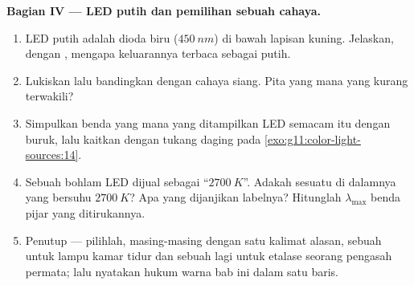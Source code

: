 \begin{problem}
\medskip
\noindent\textbf{Bagian IV --- LED putih dan pemilihan sebuah cahaya.}
\begin{enumerate}[resume]
  \item LED putih adalah dioda biru ($\qty{450}{nm}$) di bawah lapisan
         kuning. Jelaskan, dengan , mengapa
        keluarannya terbaca sebagai putih.
  \item Lukiskan  lalu bandingkan dengan 
        cahaya siang. Pita yang mana yang kurang terwakili?
  \item Simpulkan benda yang mana yang ditampilkan LED semacam itu
        dengan buruk, lalu kaitkan dengan tukang daging pada
        \cref{exo:g11:color-light-sources:14}.
  \item Sebuah bohlam LED dijual sebagai ``$\qty{2700}{K}$''. Adakah
        sesuatu di dalamnya yang bersuhu $\qty{2700}{K}$? Apa yang
        dijanjikan labelnya? Hitunglah $\lambda_{\max}$ benda pijar
        yang ditirukannya.
  \item Penutup --- pilihlah, masing-masing dengan satu kalimat
        alasan, sebuah  untuk lampu kamar tidur dan sebuah
        lagi untuk etalase seorang pengasah permata; lalu nyatakan
        hukum warna bab ini dalam satu baris.
\end{enumerate}
\end{problem}
